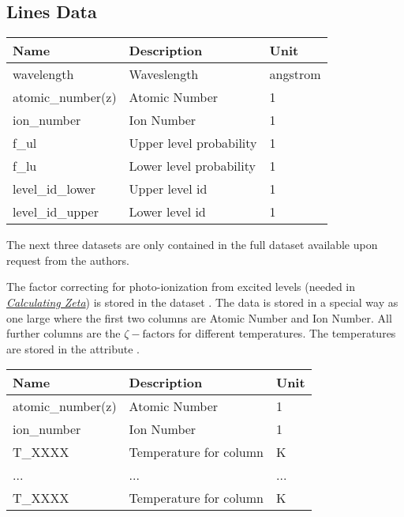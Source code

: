 \documentclass[letterpaper,10pt,english]{sphinxmanual}
\begin{document}
\subsection{Lines Data}
\label{atomic:lines-data}
\begin{tabulary}{\linewidth}{|L|L|L|}
\hline
\textbf{
Name
} & \textbf{
Description
} & \textbf{
Unit
}\\\hline

wavelength
 & 
Waveslength
 & 
angstrom
\\\hline

atomic\_number(z)
 & 
Atomic Number
 & 
1
\\\hline

ion\_number
 & 
Ion Number
 & 
1
\\\hline

f\_ul
 & 
Upper level probability
 & 
1
\\\hline

f\_lu
 & 
Lower level probability
 & 
1
\\\hline

level\_id\_lower
 & 
Upper level id
 & 
1
\\\hline

level\_id\_upper
 & 
Lower level id
 & 
1
\\\hline
\end{tabulary}


The next three datasets are only contained in the full dataset available upon request from the authors.

The factor correcting for photo-ionization from excited levels (needed in {\hyperref[plasma_doc/nebular_plasma:calc-zeta-label]{\emph{Calculating Zeta}}}) is stored in the dataset .
The data is stored in a special way as one large \href{http://docs.scipy.org/doc/numpy/reference/generated/numpy.ndarray.html\#numpy.ndarray}{} where the first two columns are Atomic Number and Ion
Number. All further columns are the $\zeta-\textrm{factors}$ for different temperatures. The temperatures are stored
in the attribute .

\begin{tabulary}{\linewidth}{|L|L|L|}
\hline
\textbf{
Name
} & \textbf{
Description
} & \textbf{
Unit
}\\\hline

atomic\_number(z)
 & 
Atomic Number
 & 
1
\\\hline

ion\_number
 & 
Ion Number
 & 
1
\\\hline

T\_XXXX
 & 
Temperature for column
 & 
K
\\\hline

...
 & 
...
 & 
...
\\\hline

T\_XXXX
 & 
Temperature for column
 & 
K
\\\hline
\end{tabulary}
\end{document}
